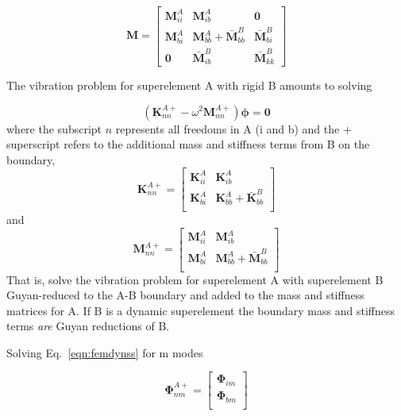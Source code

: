 \documentclass[11pt,openany,twoside]{book}
\numberwithin{equation}{section}		%
\newcommand{\Matrix}[1]{\boldsymbol{#1}}
\newcommand{\Eqn}[1]{Eq.\ \ref{#1}}  %
\begin{document}
\begin{equation}
\Matrix{M} = \left[
\begin{array}{ccc}
   \Matrix{M}_{ii}^A & \Matrix{M}_{ib}^A & \Matrix{0} \\
   \Matrix{M}_{bi}^A & \Matrix{M}_{bb}^A + \Matrix{\bar{M}}_{bb}^B & \Matrix{\bar{M}}_{bi}^B \\
   \Matrix{0} & \Matrix{\bar{M}}_{ib}^B & \Matrix{\bar{M}}_{kk}^B
\end{array}
\right]			\nonumber
\end{equation}

The vibration problem for superelement A with rigid B amounts
to solving

\begin{equation}\label{eqn:femdynss}
\left( \Matrix{K}_{nn}^{A+} - \omega^2 \Matrix{M}_{nn}^{A+} \right)  \Matrix{\phi} = \Matrix{0}
\end{equation}
where the subscript $n$ represents all freedoms in A (i and b)
and the + superscript refers to the additional mass and stiffness
terms from B on the boundary,
\begin{equation}
\Matrix{K}_{nn}^{A+} = \left[
\begin{array}{cc}
   \Matrix{K}_{ii}^A & \Matrix{K}_{ib}^A  \\
   \Matrix{K}_{bi}^A & \Matrix{K}_{bb}^A + \Matrix{\bar{K}}_{bb}^B \\
\end{array}
\right]				\nonumber
\end{equation}
and
\begin{equation}
\Matrix{M}_{nn}^{A+} = \left[
\begin{array}{cc}
   \Matrix{M}_{ii}^A & \Matrix{M}_{ib}^A  \\
   \Matrix{M}_{bi}^A & \Matrix{M}_{bb}^A + \Matrix{\bar{M}}_{bb}^B \\
\end{array}
\right]
\end{equation}
That is, solve the vibration problem for superelement A
with superelement B Guyan-reduced to the A-B boundary and
added to the mass and stiffness matrices for A.
If B is a dynamic superelement the boundary mass and stiffness
terms \emph{are} Guyan reductions of B.

Solving \Eqn{eqn:femdynss} for m modes

\begin{equation}
\Matrix{\Phi}_{nm}^{A+} = \left[
\begin{array}{c}
   \Matrix{\Phi}_{im} \\
   \Matrix{\Phi}_{bm}  \\
\end{array}
\right]
\end{equation}
\end{document}
